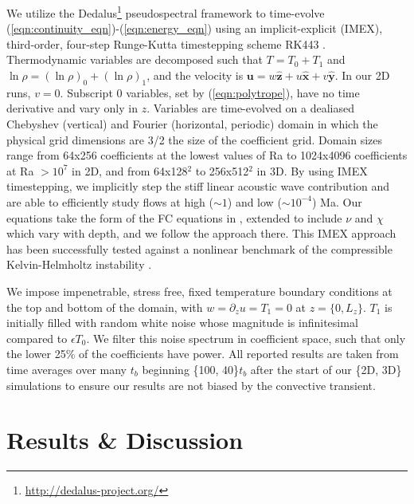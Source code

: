 \documentclass[aps, pre, onecolumn, nofootinbib, notitlepage, groupedaddress, amsfonts, amssymb, amsmath, longbibliography]{revtex4-1}
\begin{document}
We utilize the 
Dedalus\footnote{\url{http://dedalus-project.org/}} 
pseudospectral framework \cite{burns&all2016} to time-evolve  
(\ref{eqn:continuity_eqn})-(\ref{eqn:energy_eqn}) 
using an implicit-explicit (IMEX), third-order, four-step 
Runge-Kutta timestepping scheme RK443 \cite{ascher&all1997}.  
Thermodynamic variables are decomposed such that $T = T_0 + T_1$ and
$\ln\rho = (\ln\rho)_0 + (\ln\rho)_1$, 
and the velocity is $\bm{u} = w\bm{\hat{z}} + u\bm{\hat{x}} + v\bm{\hat{y}}$.
In our 2D runs, $v = 0$.
Subscript 0 variables, set by (\ref{eqn:polytrope}), 
have no time derivative and vary only in $z$.
Variables are time-evolved on a dealiased Chebyshev (vertical)
and Fourier (horizontal, periodic) domain in which the
physical grid dimensions are 3/2 the size of the coefficient grid.  
Domain sizes range from
64x256 coefficients at the lowest values of 
Ra to 1024x4096 coefficients at Ra $> 10^{7}$ in 2D,
and from 64x128$^2$ to  256x512$^2$ in 3D. 
By using IMEX timestepping, we implicitly step the 
stiff linear acoustic wave contribution and are able to
efficiently study flows at high ($\sim 1$) 
and low ($\sim 10^{-4}$) Ma.  Our equations take the form
of the FC equations in \cite{lecoanet&all2014}, extended to include
$\nu$ and $\chi$ which vary with depth, and we follow the approach there.
This IMEX approach has been successfully 
tested against a nonlinear benchmark  of the compressible 
Kelvin-Helmholtz instability \cite{Lecoanet_et_al_2016_KH}.

We impose impenetrable, stress free, fixed temperature boundary conditions at
the top and bottom of the domain, with 
$w = \partial_z u = T_1 = 0$ at $z = \{0, L_z\}$. 
$T_1$ is initially filled with
random white noise whose magnitude is infinitesimal
compared to $\epsilon T_0$.
We filter this noise spectrum in coefficient space, 
such that only the lower 25\% of the coefficients
have power. All reported results are taken from time averages
over many $t_b$ beginning \{100, 40\}$t_b$
after the start of our \{2D, 3D\} simulations to
ensure our results are not biased by the convective transient.

\section{Results \& Discussion}
\label{sec:results}
\end{document}
